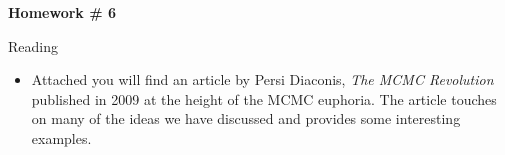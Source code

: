 \documentclass{article}
\begin{document}
\renewcommand{\a}{\textbf{a}}
\renewcommand{\b}{\textbf{b}}
\renewcommand{\d}{\textbf{d}}
\newcommand{\e}{\textbf{e}}

\large

\begin{center}
\textbf{Homework \# 6} \\  
\end{center}

\medskip


\medskip


\renewcommand{\Xi}{X^{(i)}}
\newcommand{\Yi}{\hat{Y}_i}
\newcommand{\hS}{\hat{\Sigma}}

Reading
\begin{itemize}
\item Attached you will find an article by Persi Diaconis, \textit{The MCMC Revolution} published in 2009 at the height of the MCMC euphoria.  The article touches on many of the ideas we have discussed and provides some interesting examples.
\end{itemize}
\end{document}
